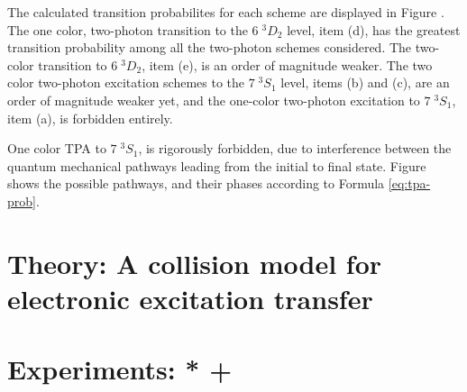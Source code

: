 \documentclass[12pt]{mitthesis}
\begin{document}

The calculated transition probabilites for each scheme are displayed
in Figure .  The one color, two-photon
transition to the $6 \; ^3D_2$ level, item (d), has the greatest
transition probability among all the two-photon schemes considered.
The two-color transition to $6 \; ^3D_2$, item (e), is an order of
magnitude weaker.  The two color two-photon excitation schemes to the
$7 \; ^3S_1$ level, items (b) and (c), are an order of magnitude
weaker yet, and the one-color two-photon excitation to $7 \; ^3S_1$,
item (a), is forbidden entirely.

One color TPA to $7 \; ^3S_1$, is rigorously forbidden, due to
interference between the quantum mechanical pathways leading from the
initial to final state.  Figure  shows the
possible pathways, and their phases according to Formula
\ref{eq:tpa-prob}.


\section{Theory: A collision model for electronic excitation transfer}

\section{Experiments: * + }
\end{document}
